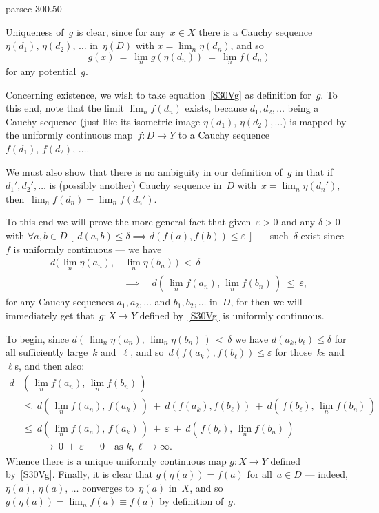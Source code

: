 \documentclass[b5page]{book}
\begin{document}
\begin{solution}{parsec-300.50}
\begin{enumerate}
Uniqueness of~$g$ is clear,
since for any~$x\in X$
there is a Cauchy sequence $\eta(d_1),\,\eta(d_2),\,\dotsc$
in~$\eta(D)$ 
with $x=\lim_n \eta(d_n)$, 
and so
\begin{equation}
\label{S30Vg}
\textstyle g(x)\ =\ \lim_n g(\eta(d_n))\ =\ \lim_n f(d_n)
\end{equation}
for any potential~$g$.

Concerning existence,
we wish to take equation~\eqref{S30Vg} as definition for~$g$.
To this end, note that the limit $\lim_n f(d_n)$ exists,
because $d_1,d_2,\dotsc$ being a Cauchy sequence
(just like its isometric image $\eta(d_1),\,\eta(d_2),\dotsc$)
is mapped by the uniformly continuous map~$f\colon D\to Y$
to a Cauchy sequence $f(d_1),\,f(d_2),\,\dotsc$.

We must also show that there is no ambiguity in our definition
of~$g$ in that if~$d_1',d_2',\dotsc$
is (possibly another) Cauchy sequence in~$D$
with~$x=\lim_n \eta(d_n')$,
then~$\lim_n f(d_n)=\lim_n f(d_n')$.

To this end we will prove the more general fact
that given~$\varepsilon>0$ and any $\delta>0$
with $\forall a,b\in D \,[\ d(a,b)\leq \delta
\implies d(f(a),f(b))\leq \varepsilon\ ]$
--- such~$\delta$ exist since~$f$ is uniformly continuous ---
we have
\begin{equation*}
\begin{alignedat}{3}
\textstyle
d(\,\lim_n\eta(a_n),&\,\textstyle \lim_n\eta(b_n)\,)\ <\  \delta\\
&\textstyle\implies\quad
d(\,\lim_n f(a_n),\,\lim_n f(b_n)\,)\ \leq \ \varepsilon,
\end{alignedat}
\end{equation*}
for any Cauchy sequences
$a_1,a_2,\dotsc$ and $b_1,b_2,\dotsc$
in~$D$,
for then we will immediately get
that~$g\colon X\to Y$
defined by~\eqref{S30Vg}
is uniformly continuous.

To begin, since
$d(\, \lim_n \eta(a_n),\,\lim_n \eta(b_n)\,)
\,<\,\delta$
 we have $d(a_k,b_\ell)\leq \delta$
for all sufficiently large~$k$ and~$\ell$,
and so~$d(f(a_k),f(b_\ell))\leq \varepsilon$
for those~$k$s and~$\ell$s,
and then  also:
\begin{equation*}
\begin{alignedat}{3}
d&\textstyle{}(\,\lim_n f(a_n),\,\lim_n f(b_n)\,)\\
\ &\textstyle\leq\ 
d(\,\lim_n f(a_n),\,f(a_k)\,)
\ +\ 
d(f(a_k),f(b_\ell))
\ +\ 
d(\,f(b_\ell),\,\lim_n f(b_n)\,)\\
\ &\textstyle\leq\ 
d(\,\lim_n f(a_n),\,f(a_k)\,)
\ +\ 
\varepsilon
\ +\ 
d(\,f(b_\ell),\,\lim_n f(b_n)\,)\\
\ &\textstyle\qquad\longrightarrow\ 0\ +\ \varepsilon \ +\ 0\quad\text{as $k,\ell\to\infty$.}
\end{alignedat}
\end{equation*}
Whence there is a unique uniformly continuous
map $g\colon X\to Y$
defined by~\eqref{S30Vg}.
Finally,
it is clear that $g(\eta(a))=f(a)$
for all~$a\in D$ ---
indeed, $\eta(a),\,\eta(a),\,\dotsc$
converges to~$\eta(a)$ in~$X$,
and so~$g(\eta(a))=\lim_n f(a)\equiv f(a)$
by definition of~$g$.


\end{enumerate}
\end{solution}
\end{document}
